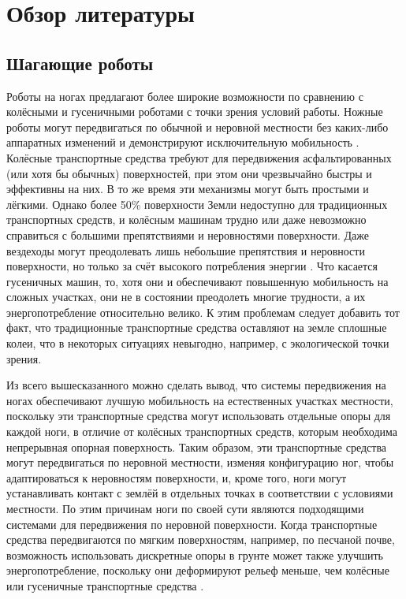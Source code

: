 \chapter{Обзор литературы}\label{ch:ch1}

\section{Шагающие роботы}\label{sec:ch1/sec1}

Роботы на ногах предлагают более широкие возможности по сравнению с колёсными и гусеничными роботами с точки зрения условий работы. Ножные роботы могут передвигаться по обычной и неровной местности без каких-либо аппаратных изменений и демонстрируют исключительную мобильность \cite{Silva2012}. Колёсные транспортные средства требуют для передвижения асфальтированных (или хотя бы обычных) поверхностей, при этом они чрезвычайно быстры и эффективны на них. В то же время эти механизмы могут быть простыми и лёгкими. Однако более 50\% поверхности Земли недоступно для традиционных транспортных средств, и колёсным машинам трудно или даже невозможно справиться с большими препятствиями и неровностями поверхности. Даже вездеходы могут преодолевать лишь небольшие препятствия и неровности поверхности, но только за счёт высокого потребления энергии \cite{Bekker1962}.  Что касается гусеничных машин, то, хотя они и обеспечивают повышенную мобильность на сложных участках, они не в состоянии преодолеть многие трудности, а их энергопотребление относительно велико.  К этим проблемам следует добавить тот факт, что традиционные транспортные средства оставляют на земле сплошные колеи, что в некоторых ситуациях невыгодно, например, с экологической точки зрения. 

Из всего вышесказанного можно сделать вывод, что системы передвижения на ногах обеспечивают лучшую мобильность на естественных участках местности, поскольку эти транспортные средства могут использовать отдельные опоры для каждой ноги, в отличие от колёсных транспортных средств, которым необходима непрерывная опорная поверхность. Таким образом, эти транспортные средства могут передвигаться по неровной местности, изменяя конфигурацию ног, чтобы адаптироваться к неровностям поверхности, и, кроме того, ноги могут устанавливать контакт с землёй в отдельных точках в соответствии с условиями местности. По этим причинам ноги по своей сути являются подходящими системами для передвижения по неровной поверхности. Когда транспортные средства передвигаются по мягким поверхностям, например, по песчаной почве, возможность использовать дискретные опоры в грунте может также улучшить энергопотребление, поскольку они деформируют рельеф меньше, чем колёсные или гусеничные транспортные средства \cite{Iida2007}. 

